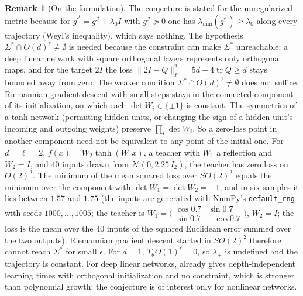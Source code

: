 \documentclass[11pt,reqno]{amsart}
\theoremstyle{definition}
\newtheorem{remark}[theorem]{Remark}
\newcommand{\Fisher}{\mathcal{I}}
\numberwithin{equation}{section}
\begin{document}
\begin{remark}[On the formulation]
The conjecture is stated for the unregularized metric because for $\tilde g^{\Fisher} = g^{\Fisher} + \lambda_0 I$ with $g^{\Fisher} \succeq 0$ one has $\lambda_{\min}(\tilde g^{\Fisher}) \ge \lambda_0$ along every trajectory (Weyl's inequality), which says nothing. The hypothesis $\Sigma^* \cap O(d)^\ell \ne \emptyset$ is needed because the constraint can make $\Sigma^*$ unreachable: a deep linear network with square orthogonal layers represents only orthogonal maps, and for the target $2I$ the loss $\|2I - Q\|_F^2 = 5d - 4\operatorname{tr}Q \ge d$ stays bounded away from zero. The weaker condition $\Sigma^* \cap O(d)^\ell \ne \emptyset$ does not suffice. Riemannian gradient descent with small steps stays in the connected component of its initialization, on which each $\det W_i \in \{\pm1\}$ is constant. The symmetries of a tanh network (permuting hidden units, or changing the sign of a hidden unit's incoming and outgoing weights) preserve $\prod_i \det W_i$. So a zero-loss point in another component need not be equivalent to any point of the initial one. For $d = \ell = 2$, $f(x) = W_2 \tanh(W_1 x)$, a teacher with $W_1$ a reflection and $W_2 = I$, and $40$ inputs drawn from $\mathcal{N}(0, 2.25\,I_2)$, the teacher has zero loss on $O(2)^2$. The minimum of the mean squared loss over $SO(2)^2$ equals the minimum over the component with $\det W_1 = \det W_2 = -1$, and in six samples it lies between $1.57$ and $1.75$ (the inputs are generated with NumPy's \texttt{default\_rng} with seeds $1000,\dots,1005$; the teacher is $W_1 = \bigl(\begin{smallmatrix}\cos 0.7 & \sin 0.7\\ \sin 0.7 & -\cos 0.7\end{smallmatrix}\bigr)$, $W_2 = I$; the loss is the mean over the $40$ inputs of the squared Euclidean error summed over the two outputs). Riemannian gradient descent started in $SO(2)^2$ therefore cannot reach $\Sigma^*$ for small $\epsilon$. For $d = 1$, $T_\theta O(1)^\ell = 0$, so $\lambda_+$ is undefined and the trajectory is constant. For deep linear networks, \cite{saxe2014} already gives depth-independent learning times with orthogonal initialization and no constraint, which is stronger than polynomial growth; the conjecture is of interest only for nonlinear networks.
\end{remark}
\end{document}
